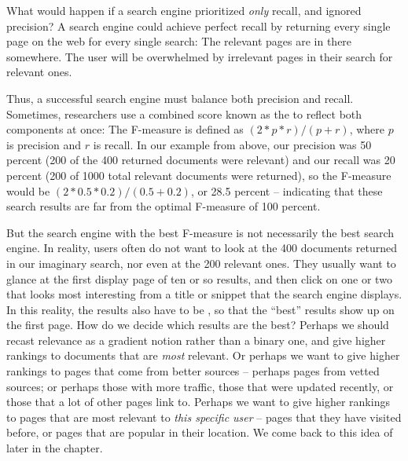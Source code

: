What would happen if a search engine prioritized \emph{only} recall, and ignored precision?  A search engine could achieve perfect recall by returning every single page on the web for every single search: The relevant pages are in there somewhere.  The user will be overwhelmed by irrelevant pages in their search for relevant ones.

Thus, a successful search engine must balance both precision and recall.  Sometimes, researchers use a combined score known as the  to reflect both components at once:  The F-measure is defined as $(2 * p * r)/(p + r)$, where $p$ is precision and $r$ is recall.  In our example from above, our precision was 50 percent (200 of the 400 returned documents were relevant) and our recall was 20 percent (200 of 1000 total relevant documents were returned), so the F-measure would be $({2 * 0.5 * 0.2})/({0.5 + 0.2})$, or 28.5 percent -- indicating that these search results are far from the optimal F-measure of 100 percent.  

But the search engine with the best F-measure is not necessarily the best search engine. In reality, users often do not want to look at the 400 documents returned in our imaginary search, nor even at the 200 relevant ones.  They usually want to glance at the first display page of ten or so results, and then click on  one or two that looks most interesting from a title or snippet that the search engine displays.  In this reality, the results also have to be , so that the ``best'' results show up on the first page.   How do we decide which results are the best?  Perhaps we should recast relevance as a gradient notion rather than a binary one, and give higher rankings to documents that are \emph{most} relevant.  Or perhaps we want to give higher rankings to pages that come from better sources -- perhaps pages from vetted sources; or perhaps those with more traffic, those that were updated recently, or those that a lot of other pages link to.  Perhaps we want to give higher rankings to pages that are most relevant to \emph{this specific user} -- pages that they have visited before, or pages that are popular in their location.  We come back to this idea of  later in the chapter.


